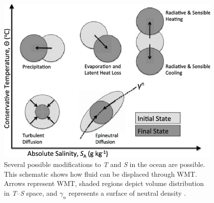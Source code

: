 \documentclass[a4paper,12pt]{article}
\begin{document}
    \begin{figure} %
    \centering
    \includegraphics[width=\linewidth]{../figures/groeskamp_schematic.png}
    \caption{Several possible modifications to \emph{T} and \emph{S} in the ocean are possible. This schematic shows how fluid can be displaced through WMT. Arrows represent WMT, shaded regions depict volume distribution in \emph{T}--\emph{S} space, and $\gamma_n$ represents a surface of neutral density \cite{Groeskamp2014}.}
    \label{fig:groeskamp}
    \end{figure}
\end{document}
